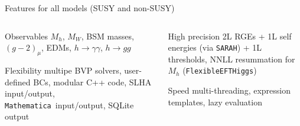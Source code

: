 \documentclass[hyperref={pdfpagelabels=false},ngerman]{beamer}
\newcommand{\SARAH}{\texttt{SARAH}}
\newcommand{\Mathematica}{\texttt{Mathematica}}
\begin{document}
\begin{frame}{Features for all models (SUSY and non-SUSY)}
  \begin{columns}[T]
    \begin{column}{0.49\textwidth}
      \begin{obsblock}{Observables}
        $M_h$, $M_W$, BSM masses, $(g-2)_\mu$, EDMs,
        $h\rightarrow\gamma\gamma$, $h\rightarrow gg$
      \end{obsblock}
      \begin{flexblock}{Flexibility}
        multipe BVP solvers, user-defined BCs, modular C++ code, SLHA
        input/output, \Mathematica\ input/output, SQLite output
      \end{flexblock}
    \end{column}
    \begin{column}{0.49\textwidth}
      \begin{precblock}{High precision}
        2L RGEs + 1L self energies (via \SARAH) + 1L thresholds,
        NNLL resummation for $M_h$ (\texttt{FlexibleEFTHiggs})
      \end{precblock}
      \begin{speedblock}{Speed}
        multi-threading, expression templates, lazy evaluation
      \end{speedblock}
    \end{column}
  \end{columns}
\end{frame}

\newenvironment{modelblock}[1]{%
  \setbeamercolor{block body}{bg=darkyellow!15}
  \setbeamercolor{block title}{fg=black,bg=darkyellow}
  \begin{block}{#1}}{\end{block}}
\end{document}
